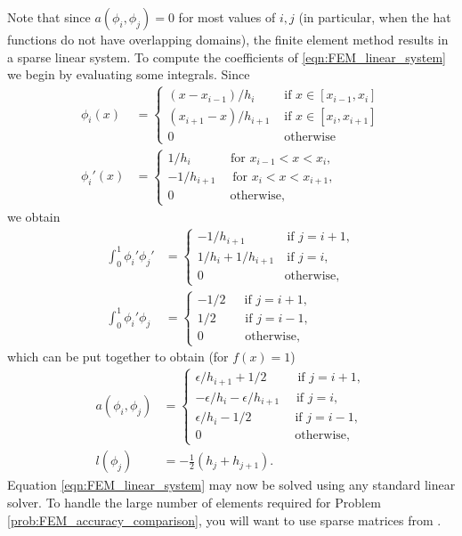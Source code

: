 Note that since $a(\phi_i,\phi_j) = 0$ for most values of $i, j$ (in particular, when the hat functions do not have overlapping domains), the finite element method results in a sparse linear system.
To compute the coefficients of \eqref{eqn:FEM_linear_system} we begin by evaluating some integrals.
Since
\begin{align*}
\phi_i(x) &= \begin{cases}
(x - x_{i-1})/h_i &\text{ if } x \in [x_{i-1},x_i]\\
 (x_{i+1} - x)/h_{i+1}  &\text{ if } x \in [x_{i},x_{i+1}]\\
0 &\text{ otherwise}
\end{cases}
\\
\phi_i'(x) &= \begin{cases}
1/h_i \quad \quad \quad \, \text{for } x_{i-1} < x < x_i,\\
 -1/h_{i+1} \quad \text{ for } x_{i} < x < x_{i+1},\\
0 \quad \quad \quad \quad \, \text{ otherwise},
\end{cases}
\end{align*}
we obtain
\begin{align*}
\int_0^1  \phi_i'\phi_j' &= \begin{cases}
- 1/h_{i+1} \quad \quad \quad \text{ if } j=i+1,\\
1/h_i + 1/h_{i+1} \quad \text{if } j=i,\\
0 \quad \quad \quad \quad \quad \quad \, \text{ otherwise},
\end{cases} \\
\int_0^1  \phi_i'\phi_j &= \begin{cases}
- 1/2 \quad \,\text{ if } j=i+1,\\
1/2 \quad \quad \text{ if } j=i-1,\\
0 \quad \quad \quad \text{ otherwise},
\end{cases}
\end{align*}
which can be put together to obtain (for \(f(x)=1\))
\begin{align}
a(\phi_i,\phi_j) &= \begin{cases}
\epsilon/h_{i+1} + 1/2 \quad \quad \, \text{ if } j=i+1,\\
-\epsilon/h_i -\epsilon/h_{i+1} \quad  \text{ if } j=i,\\
\epsilon/h_i - 1/2 \quad \quad \quad \, \text{ if } j=i-1,\\
0 \quad \quad \quad \quad \quad \quad \,\,\,\,\,\,\, \text{ otherwise},
\end{cases}
\label{eqn:FEM:a_definition}
\\
l(\phi_j) &= -\frac{1}{2}(h_j + h_{j+1}).
\label{eqn:FEM:l_definition}
\end{align}
Equation \eqref{eqn:FEM_linear_system} may now be solved using any standard linear solver. 
To handle the large number of elements required for Problem \ref{prob:FEM_accuracy_comparison}, you will want to use sparse matrices from .

